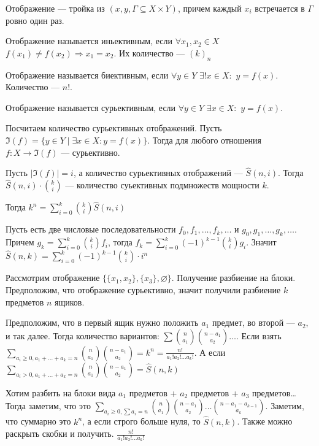 \begin{definition}
     Отображение --- тройка из $\left(x, y, \Gamma \subseteq X \times Y \right)$, причем каждый  $x_i$ встречается в $\Gamma$ ровно один раз. 
\end{definition}
 \begin{definition}
     Отображение называется иньективным, если $\forall x_1, x_2 \in X$ $f(x_1) \neq f(x_2) \Rightarrow x_1 = x_2$. Их количество --- $(k)_n$
 \end{definition}
 \begin{definition}
     Отображение называется биективным, если $\forall y \in Y$  $\exists! x \in X:$  $y = f(x)$. Количество --- $n!$.
 \end{definition}
 \begin{definition}
     Отображение называется сурьективным, если $\forall y \in Y$  $\exists x \in X:$  $y = f(x)$.
 \end{definition}
 
 Посчитаем количество сурьективных отображений. Пусть $\Im(f) = \{y \in Y \mid \exists x \in X: y = f(x)\}$. Тогда для любого отношения  $f: X \to \Im(f)$ --- сурьективно.

 Пусть $|\Im(f)| = i$, а количество сурьективных отображений ---  $\widehat{S}(n, i)$. Тогда  $\widehat{S}(n, i)\cdot\binom{k}{i}$ --- количество суьективных подмножеств мощности  $k$.

 Тогда  $k^n = \sum_{i=0}^k \binom{k}{i} \widehat{S}(n, i)$
 
 Пусть есть две числовые последовательности  $f_0, f_1,\ldots, f_k, \ldots$ и $g_0, g_1,\ldots, g_k, \ldots$. Причем $g_k = \sum_{i=0}^k \binom{k}{i} f_i$, тогда  $f_k = \sum_{i=0}^{k} (-1)^{k-1} \binom{k}{i}g_i$. Значит  $\widehat{S}(n, k) = \sum_{i=0}^k (-1)^{k-1} \binom{k}{i} \cdot i^n$ 

 Рассмотрим отображение  $\{\{x_1, x_2\}, \{x_3\}, \varnothing\}$. Получение разбиение на блоки. Предположим, что отображение сурьективно, значит получили разбиение $k$ предметов  $n$ ящиков. 

 Предположим, что в первый ящик нужно положить $a_1$ предмет, во второй ---  $a_2$,  и так далее. Тогда количество вариантов: $\sum \binom{n}{a_1}\binom{n-a_1}{a_2}\ldots$. Если взять $\sum_{a_i \ge 0, a_1+\ldots+a_k=n}\binom{n}{a_1}\binom{n-a_1}{a_2} = k^n = \frac{ n!}{a_1!a_2!\ldots a_k!}$. А если $\sum_{a_i > 0, a_1+\ldots+a_k=n}\binom{n}{a_1}\binom{n-a_1}{a_2} = \widehat{S}(n, k)$ 

 Хотим разбить на блоки вида $a_1$ предметов +  $a_2$ предметов +  $a_3$ предметов\ldots Тогда заметим, что это $\sum_{a_i\ge 0, \sum a_i = n} \binom{n}{a_1} \binom{n-a_1}{a_2} \ldots \binom{n-a_1-a_{k-1}}{a_k}$. Заметим, что суммарно это $k^n$, а если строго больше нуля, то  $\widehat{S}(n, k)$. Также можно раскрыть скобки и получить. $\frac{n!}{a_1!a_2!\ldots a_k!}$


